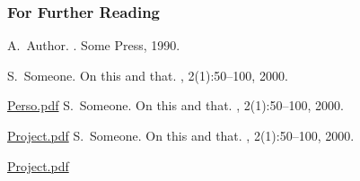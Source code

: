 \documentclass{beamer}
\begin{document}
\begin{frame}[allowframebreaks]
  \frametitle<presentation>{For Further Reading}
    
  \begin{thebibliography}{10}
    
  \beamertemplatebookbibitems

    A.~Author.
    .
    \newblock Some Press, 1990.
 
    
  \beamertemplatearticlebibitems

    S.~Someone.
    \newblock On this and that.
    , 2(1):50--100,
    2000.
    
    
    \url{Perso.pdf}
    S.~Someone.
    \newblock On this and that.
    , 2(1):50--100,
    2000.
    
    \url{Project.pdf}
    S.~Someone.
    \newblock On this and that.
    , 2(1):50--100,
    2000.
    
    \url{Project.pdf}
 
  \end{thebibliography}
\end{frame}
\end{document}

